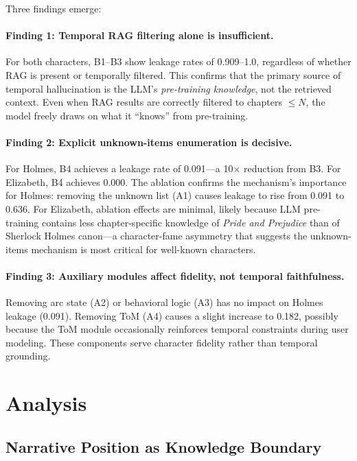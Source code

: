 \documentclass[11pt,a4paper]{article}
\begin{document}
Three findings emerge:

\paragraph{Finding 1: Temporal RAG filtering alone is insufficient.}
For both characters, B1--B3 show leakage rates of 0.909--1.0, regardless of whether RAG is present or temporally filtered.
This confirms that the primary source of temporal hallucination is the LLM's \textit{pre-training knowledge}, not the retrieved context.
Even when RAG results are correctly filtered to chapters $\leq N$, the model freely draws on what it ``knows'' from pre-training.

\paragraph{Finding 2: Explicit unknown-items enumeration is decisive.}
For Holmes, B4 achieves a leakage rate of 0.091---a 10$\times$ reduction from B3.
For Elizabeth, B4 achieves 0.000.
The ablation confirms the mechanism's importance for Holmes: removing the unknown list (A1) causes leakage to rise from 0.091 to 0.636.
For Elizabeth, ablation effects are minimal, likely because LLM pre-training contains less chapter-specific knowledge of \textit{Pride and Prejudice} than of Sherlock Holmes canon---a character-fame asymmetry that suggests the unknown-items mechanism is most critical for well-known characters.

\paragraph{Finding 3: Auxiliary modules affect fidelity, not temporal faithfulness.}
Removing arc state (A2) or behavioral logic (A3) has no impact on Holmes leakage (0.091).
Removing ToM (A4) causes a slight increase to 0.182, possibly because the ToM module occasionally reinforces temporal constraints during user modeling.
These components serve character fidelity rather than temporal grounding.

\section{Analysis}
\label{sec:analysis}

\subsection{Narrative Position as Knowledge Boundary}
\label{sec:knowledge-boundary}
\end{document}
